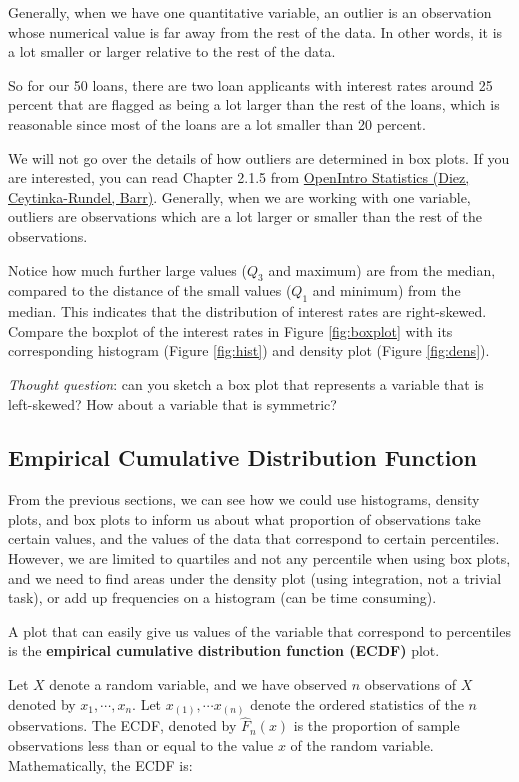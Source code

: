 \documentclass[
]{book}
\begin{document}
Generally, when we have one quantitative variable, an outlier is an observation whose numerical value is far away from the rest of the data. In other words, it is a lot smaller or larger relative to the rest of the data.

So for our 50 loans, there are two loan applicants with interest rates around 25 percent that are flagged as being a lot larger than the rest of the loans, which is reasonable since most of the loans are a lot smaller than 20 percent.

We will not go over the details of how outliers are determined in box plots. If you are interested, you can read Chapter 2.1.5 from \href{https://www.openintro.org/book/os/}{OpenIntro Statistics (Diez, Ceytinka-Rundel, Barr)}. Generally, when we are working with one variable, outliers are observations which are a lot larger or smaller than the rest of the observations.

Notice how much further large values (\(Q_3\) and maximum) are from the median, compared to the distance of the small values (\(Q_1\) and minimum) from the median. This indicates that the distribution of interest rates are right-skewed. Compare the boxplot of the interest rates in Figure \ref{fig:boxplot} with its corresponding histogram (Figure \ref{fig:hist}) and density plot (Figure \ref{fig:dens}).

\emph{Thought question}: can you sketch a box plot that represents a variable that is left-skewed? How about a variable that is symmetric?

\hypertarget{ecdf}{%
\subsection{Empirical Cumulative Distribution Function}\label{ecdf}}

From the previous sections, we can see how we could use histograms, density plots, and box plots to inform us about what proportion of observations take certain values, and the values of the data that correspond to certain percentiles. However, we are limited to quartiles and not any percentile when using box plots, and we need to find areas under the density plot (using integration, not a trivial task), or add up frequencies on a histogram (can be time consuming).

A plot that can easily give us values of the variable that correspond to percentiles is the \textbf{empirical cumulative distribution function (ECDF)} plot.

Let \(X\) denote a random variable, and we have observed \(n\) observations of \(X\) denoted by \(x_1, \cdots, x_n\). Let \(x_{(1)}, \cdots x_{(n)}\) denote the ordered statistics of the \(n\) observations. The ECDF, denoted by \(\hat{F}_n(x)\) is the proportion of sample observations less than or equal to the value \(x\) of the random variable. Mathematically, the ECDF is:
\end{document}

